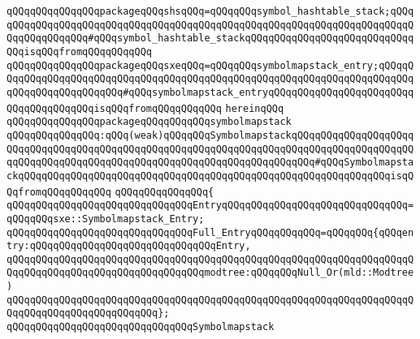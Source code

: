 \verb|qQQqqQQqqQQqqQQqpackageqQQqshsqQQq=qQQqqQQqsymbol_hashtable_stack;qQQqqQQqqQQqqQQqqQQqqQQqqQQqqQQqqQQqqQQqqQQqqQQqqQQqqQQqqQQqqQQqqQQqqQQqqQQqqQQqqQQqqQQq#qQQqsymbol_hashtable_stackqQQqqQQqqQQqqQQqqQQqqQQqqQQqqQQqisqQQqfromqQQqqQQqqQQq|\newline
\verb|qQQqqQQqqQQqqQQqpackageqQQqsxeqQQq=qQQqqQQqsymbolmapstack_entry;qQQqqQQqqQQqqQQqqQQqqQQqqQQqqQQqqQQqqQQqqQQqqQQqqQQqqQQqqQQqqQQqqQQqqQQqqQQqqQQqqQQqqQQqqQQqqQQq#qQQqsymbolmapstack_entryqQQqqQQqqQQqqQQqqQQqqQQqqQQqqQQqqQQqqQQqisqQQqfromqQQqqQQqqQQq|\newline
\verb|hereinqQQq|\newline
\newline
\newline
\verb|qQQqqQQqqQQqqQQqpackageqQQqqQQqqQQqsymbolmapstack|\newline
\verb|qQQqqQQqqQQqqQQq:qQQq(weak)qQQqqQQqSymbolmapstackqQQqqQQqqQQqqQQqqQQqqQQqqQQqqQQqqQQqqQQqqQQqqQQqqQQqqQQqqQQqqQQqqQQqqQQqqQQqqQQqqQQqqQQqqQQqqQQqqQQqqQQqqQQqqQQqqQQqqQQqqQQqqQQqqQQqqQQqqQQqqQQq#qQQqSymbolmapstackqQQqqQQqqQQqqQQqqQQqqQQqqQQqqQQqqQQqqQQqqQQqqQQqqQQqqQQqqQQqqQQqisqQQqfromqQQqqQQqqQQq|\newline
\verb|qQQqqQQqqQQqqQQq{|\newline
\verb|qQQqqQQqqQQqqQQqqQQqqQQqqQQqqQQqEntryqQQqqQQqqQQqqQQqqQQqqQQqqQQqqQQq=qQQqqQQqsxe::Symbolmapstack_Entry;|\newline
\newline
\verb|qQQqqQQqqQQqqQQqqQQqqQQqqQQqqQQqFull_EntryqQQqqQQqqQQq=qQQqqQQq{qQQqentry:qQQqqQQqqQQqqQQqqQQqqQQqqQQqqQQqEntry,|\newline
\verb|qQQqqQQqqQQqqQQqqQQqqQQqqQQqqQQqqQQqqQQqqQQqqQQqqQQqqQQqqQQqqQQqqQQqqQQqqQQqqQQqqQQqqQQqqQQqqQQqqQQqqQQqmodtree:qQQqqQQqNull_Or(mld::Modtree)|\newline
\verb|qQQqqQQqqQQqqQQqqQQqqQQqqQQqqQQqqQQqqQQqqQQqqQQqqQQqqQQqqQQqqQQqqQQqqQQqqQQqqQQqqQQqqQQqqQQqqQQq};|\newline
\newline
\verb|qQQqqQQqqQQqqQQqqQQqqQQqqQQqqQQqSymbolmapstack|\newline
